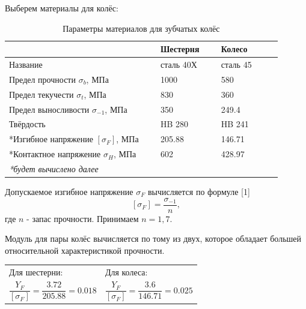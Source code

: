 \documentclass[14pt,a4paper,russian]{scrartcl}
\begin{document}
        Выберем материалы для колёс:
        \begin{table}[h!]
            \begin{center}
                \begin{tabular}{p{0.5\linewidth}p{0.2\linewidth}p{0.2\linewidth}}
                    \hline
                        & Шестерня  &   Колесо\\
                    \hline
                    Название    & сталь 40Х &   сталь 45 \\
                    Предел прочности \( \sigma_b \), МПа  & 1000 & 580 \\
                    Предел текучести \( \sigma_t \), МПа  &   830 & 360 \\
                    Предел выносливости \( \sigma_{-1} \), МПа  & 350 & 249.4 \\
                    Твёрдость       & HB 280 & HB 241 \\
                    *Изгибное напряжение \( [\sigma_F] \), МПа & 205.88 & 146.71 \\
                    *Контактное напряжение \( \sigma_H \), МПа & 602 & 428.97 \\
                    \hline
                    \emph{*будет вычислено далее}
                \end{tabular}
                \caption{Параметры материалов для зубчатых колёс}\label{tab:gear_materials}
            \end{center}
        \end{table}

        Допускаемое изгибное напряжение \( \sigma_F \) вычисляется по формуле [1] 
        \[ [\sigma_F] = \frac{\sigma_{-1}}{n}, \]
        где \( n \) - запас прочности. Принимаем \( n=1,7 \).\par
        
        Модуль для пары колёс вычисляется по тому из двух, которое обладает
        большей относительной характеристикой прочности.

       \begin{table}[h!]
            \begin{center}
                \begin{tabular}{p{0.5\linewidth}p{0.5\linewidth}}
                    Для шестерни:  &   Для колеса:\\
                    \[ \frac{Y_F}{[\sigma_F]} = 
                        \frac{3.72}{205.88} = 0.018\] &
                    \[ \frac{Y_F}{[\sigma_F]} = 
                    \frac{3.6}{146.71} = 0.025 \]\\                    
                \end{tabular}
            \end{center}
        \end{table}
\end{document}
